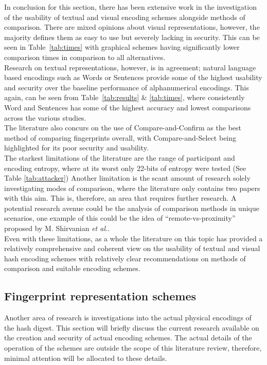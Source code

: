 In conclusion for this section, there has been extensive work in the investigation of the usability of textual and visual encoding schemes alongside methods of comparison. There are mixed opinions about visual representations, however, the majority defines them as easy to use but severely lacking in security. This can be seen in Table~\ref{tab:times} with graphical schemes having significantly lower comparison times in comparison to all alternatives. \\
Research on textual representations, however, is in agreement; natural language based encodings such as Words or Sentences provide some of the highest usability and security over the baseline performance of alphanumerical encodings. This again, can be seen from Table~\ref{tab:results} \& \ref{tab:times}, where consistently Word and Sentences has some of the highest accuracy and lowest comparisons across the various studies.\\
The literature also concurs on the use of Compare-and-Confirm as the best method of comparing fingerprints overall, with Compare-and-Select being highlighted for its poor security and usability.\\
The starkest limitations of the literature are the range of participant and encoding entropy, where at its worst only 22-bits of entropy were tested (See Table \ref{tab:attacker}) Another limitation is the scant amount of research solely investigating modes of comparison, where the literature only contains two papers with this aim. This is, therefore, an area that requires further research. A potential research avenue could be the analysis of comparison methods in unique scenarios, one example of this could be the idea of ``remote-vs-proximity'' proposed by M. Shirvanian \textit{et al.}\cite{shirvanian2017pitfalls}. \\
Even with these limitations, as a whole the literature on this topic has provided a relatively comprehensive and coherent view on the usability of textual and visual hash encoding schemes with relatively clear recommendations on methods of comparison and suitable encoding schemes. 

\subsection{Fingerprint representation schemes}
Another area of research is investigations into the actual physical encodings of the hash digest. This section will briefly discuss the current research available on the creation and security of actual encoding schemes. The actual details of the operation of the schemes are outside the scope of this literature review, therefore, minimal attention will be allocated to these details.

